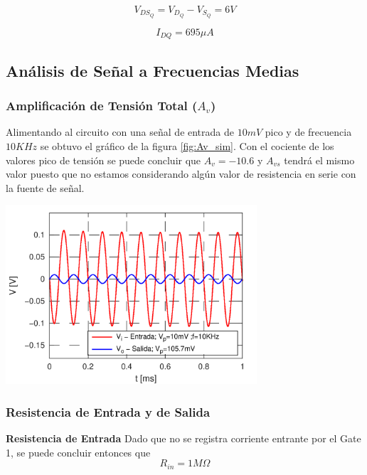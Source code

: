 \documentclass[a4paper, 10pt, spanish]{article}
\begin{document}
\begin{equation}
  V_{DS_{Q}} = V_{D_Q} - V_{S_Q} = 6V
\end{equation}

\begin{equation}
  I_{DQ} = 695 \mu A
\end{equation}


\subsection{Análisis de Señal a Frecuencias Medias}

\subsubsection{Amplificación de Tensión Total ($A_v$)}
Alimentando al circuito con una señal de entrada de $10mV$ pico y de frecuencia $10KHz$ se obtuvo el gráfico de la figura \ref{fig:Av_sim}. Con el cociente de los valores pico de tensión se puede concluir que $A_v=-10.6$ y $A_{vs}$ tendrá el mismo valor puesto que no estamos considerando algún valor de resistencia en serie con la fuente de señal.

\begin{center}
  \includegraphics[width=0.7\textwidth]{Av_sim.png}
  \label{fig:Av_sim}
\end{center}

\subsubsection{Resistencia de Entrada y de Salida}
\textbf{Resistencia de Entrada}
Dado que no se registra corriente entrante por el Gate 1, se puede concluir entonces que
\begin{equation}
  R_{in} = 1M\Omega
\end{equation}
\end{document}
